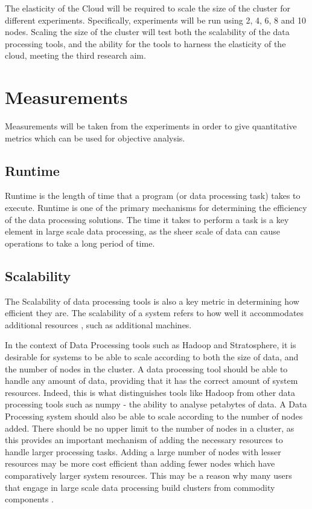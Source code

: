 The elasticity of the Cloud will be required to scale the size of the cluster for different experiments. Specifically, experiments will be run using 2, 4, 6, 8 and 10 nodes. Scaling the size of the cluster will test both the scalability of the data processing tools, and the ability for the tools to harness the elasticity of the cloud, meeting the third research aim.

\section{Measurements}
Measurements will be taken from the experiments in order to give quantitative metrics which can be used for objective analysis.  

\subsection{Runtime}
Runtime is the length of time that a program (or data processing task) takes to execute. Runtime is one of the primary mechanisms for determining the efficiency of the data processing solutions. The time it takes to perform a task is a key element in large scale data processing, as the sheer scale of data can cause operations to take a long period of time. 

\subsection{Scalability}
The Scalability of data processing tools is also a key metric in determining how efficient they are. The scalability of a system refers to how well it accommodates additional resources \cite{bondi2000characteristics}, such as additional machines. 

In the context of Data Processing tools such as Hadoop and Stratosphere, it is desirable for systems to be able to scale according to both the size of data, and the number of nodes in the cluster. A data processing tool should be able to handle any amount of data, providing that it has the correct amount of system resources. Indeed, this is what distinguishes tools like Hadoop from other data processing tools such as numpy - the ability to analyse petabytes of data. A Data Processing system should also be able to scale according to the number of nodes added. There should be no upper limit to the number of nodes in a cluster, as this provides an important mechanism of adding the necessary resources to handle larger processing tasks. Adding a large number of nodes with lesser resources may be more cost efficient than adding fewer nodes which have comparatively larger system resources. This may be a reason why many users that engage in large scale data processing build clusters from commodity components \cite{taylor2010overview}.  

